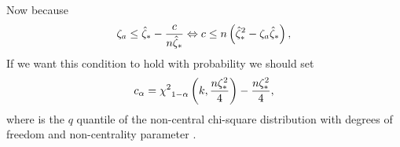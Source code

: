 \documentclass[10pt,a4paper,english]{article}
\theoremstyle{plain}
\theoremstyle{definition}
\theoremstyle{remark}
\providecommand{\cono}[1][\typeI]{\mathSUB{c}{#1}}
\begin{document}
Now because 
$$
\psnr[a] \le \ssropt - \frac{c}{\ssiz\ssropt} 
  \Leftrightarrow c \le \ssiz \wrapParens{\ssrsqopt - \psnr[a]\ssropt},
$$
%
%
If we want this condition to hold with probability \typeI we should set
\begin{equation}
\cono[\typeI] = {\chisqqnt{1-\typeI}{\nstrat, \frac{\ssiz\psnrsqopt}{4}} - \frac{\ssiz\psnrsqopt}{4}},
\end{equation}
where  is the $q$ quantile of the non-central chi-square distribution
with \df degrees of freedom and non-centrality parameter \nctp.
\end{document}
